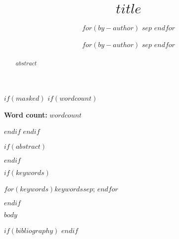 \documentclass[
    a4paper,
    man,
    floatsintext
]{glossaPX2}
\title[$shorttitle$]{$title$}
\author[]{}%
\author[]{
    $for(by-author)$
    \spauthor{
    $by-author.name.literal$\\
    $if(by-author.affiliations)$
      $for(by-author.affiliations)$
        \institute{$by-author.affiliations.name$}\\
      $endfor$
    $endif$
    $if(by-author.email)$
      \small{$by-author.email$\\}
    $endif$
    $if(by-author.orcid)$
      \small{ORCID: $by-author.orcid$}
    $endif$
    }
    $sep$ \AND
    $endfor$
    }
\author[]{
  $for(by-author)$
  \spauthor{
  $by-author.name.literal$\\
  $if(by-author.affiliations)$
    $for(by-author.affiliations)$
      \institute{$by-author.affiliations.name$}\\
    $endfor$
  $endif$
  $if(by-author.email)$
    \small{$by-author.email$\\}
  $endif$
  $if(by-author.orcid)$
    \small{ORCID: $by-author.orcid$}
  $endif$
  }
  $sep$ \AND
  $endfor$
  }
\begin{document}
\maketitle

$if(masked)$
  $if(wordcount)$
\begin{center}
\textbf{Word count:} $wordcount$
\end{center}
  $endif$
$endif$


$if(abstract)$
\begin{abstract}
$abstract$
\end{abstract}
$endif$

$if(keywords)$
\begin{keywords}
$for(keywords)$$keywords$$sep$; $endfor$
\end{keywords}
$endif$

$body$

$if(bibliography)$
\printbibliography
$endif$
\end{document}
